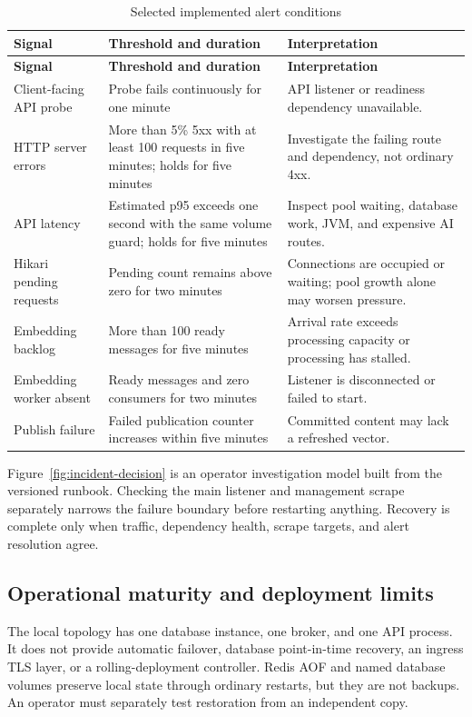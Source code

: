 \documentclass[12pt,a4paper,oneside]{report}
\begin{document}
\begin{longtable}{P{0.26\textwidth}P{0.35\textwidth}P{0.28\textwidth}}
\caption{Selected implemented alert conditions}\\\toprule
\textbf{Signal} & \textbf{Threshold and duration} & \textbf{Interpretation}\\\midrule\endfirsthead
\toprule\textbf{Signal} & \textbf{Threshold and duration} & \textbf{Interpretation}\\\midrule\endhead
Client-facing API probe & Probe fails continuously for one minute & API listener or readiness dependency unavailable.\\
HTTP server errors & More than 5\% 5xx with at least 100 requests in five minutes; holds for five minutes & Investigate the failing route and dependency, not ordinary 4xx.\\
API latency & Estimated p95 exceeds one second with the same volume guard; holds for five minutes & Inspect pool waiting, database work, JVM, and expensive AI routes.\\
Hikari pending requests & Pending count remains above zero for two minutes & Connections are occupied or waiting; pool growth alone may worsen pressure.\\
Embedding backlog & More than 100 ready messages for five minutes & Arrival rate exceeds processing capacity or processing has stalled.\\
Embedding worker absent & Ready messages and zero consumers for two minutes & Listener is disconnected or failed to start.\\
Publish failure & Failed publication counter increases within five minutes & Committed content may lack a refreshed vector.\\
\bottomrule
\end{longtable}

\incidentdecisiondiagram

Figure~\ref{fig:incident-decision} is an operator investigation model built from the
versioned runbook. Checking the main listener and management scrape separately narrows
the failure boundary before restarting anything. Recovery is complete only when traffic,
dependency health, scrape targets, and alert resolution agree.

\subsection{Operational maturity and deployment limits}
The local topology has one database instance, one broker, and one API process. It does
not provide automatic failover, database point-in-time recovery, an ingress TLS layer,
or a rolling-deployment controller. Redis AOF and named database volumes preserve local
state through ordinary restarts, but they are not backups. An operator must separately
test restoration from an independent copy.
\end{document}
